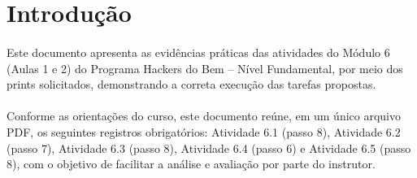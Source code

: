 \section{Introdução}

\paragraph{}
Este documento apresenta as evidências práticas das atividades do Módulo 6
(Aulas 1 e 2) do Programa Hackers do Bem -- Nível Fundamental, por meio dos
prints solicitados, demonstrando a correta execução das tarefas propostas.

\paragraph{}
Conforme as orientações do curso, este documento reúne, em um único arquivo
PDF, os seguintes registros obrigatórios: Atividade 6.1 (passo 8), Atividade
6.2 (passo 7), Atividade 6.3 (passo 8), Atividade 6.4 (passo 6) e Atividade 6.5
(passo 8), com o objetivo de facilitar a análise e avaliação por parte do
instrutor.
